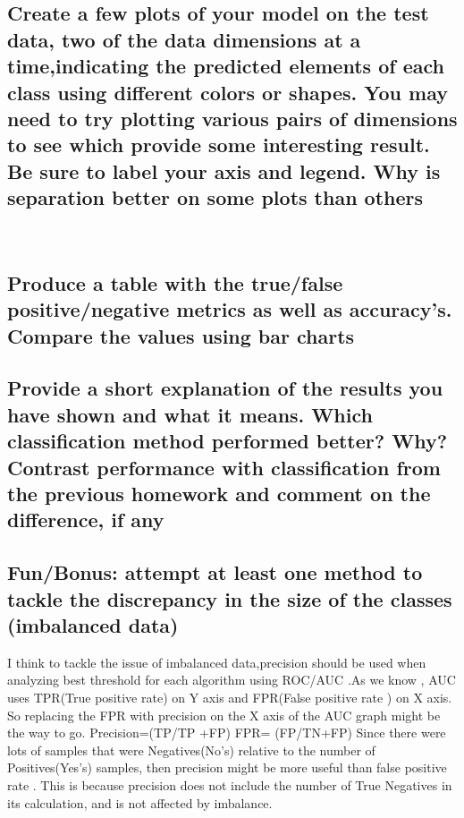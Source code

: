 \subsection{Create a few plots of your model on the test data, two of the data dimensions at a time,indicating the predicted elements of each class using different colors or shapes. You may need to try plotting various pairs of dimensions to see which provide some interesting result. Be sure to label your axis and legend. Why is separation better on some plots than others}

\\







\subsection{Produce a table with the true/false positive/negative metrics as well as accuracy's. Compare the values using bar charts}


\subsection{Provide a short explanation of the results you have shown and what it means. Which classification method performed better? Why? Contrast performance with classification from the previous homework and comment on the difference, if any}






\subsection{ Fun/Bonus: attempt at least one method to tackle the discrepancy in the size of the classes (imbalanced data)}
 I think to tackle the issue of imbalanced data,precision should be used when analyzing best threshold for each algorithm using ROC/AUC .As we know , AUC uses TPR(True positive rate) on Y axis and FPR(False positive rate ) on X axis. So replacing the FPR with precision on the X axis of the AUC graph might be the way to go.
 Precision=(TP/TP +FP) FPR= (FP/TN+FP)
 Since there were lots of samples that were Negatives(No's) relative to the number of Positives(Yes's) samples, then precision might be more useful than false positive rate . This is because precision does not include the number of True Negatives in its calculation, and is not affected by imbalance.

